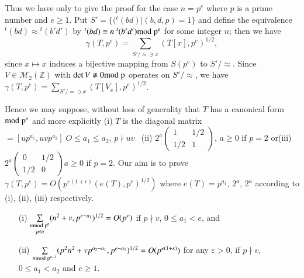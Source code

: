 Thus we have only to give the proof for the case $n=p^{e}$ where $p$
is a prime number and $e\geq 1$. Put $S'=\{({}^{t}(bd)|(b,d,p)=1\}$
and define the equivalence ${}^{t}(bd)\approx {}^{t}(b'd')$ by
${}^{t}(bd)\equiv n \; {}^{t}(b'd')\rm{mod} \; p^{e}$ for some integer $n$; then
we have
$$
\gamma(T,p^{e})=\sum_{S'/\approx \ni x}(T[x],p^{e})^{1/2},
$$
since $x\mapsto x$ induces a bijective mapping from $S(p^{e})$ to
$S'/\approx$. Since $V\in\mathscr{M}_{2}(\mathbb{Z})$ with $\det
V\not\equiv 0\rm{mod} \; p$ operates on $S'/\approx$, we have
$\gamma(T,p^{e})=\sum\limits_{S'/=\ni x}(T[V_{x}],p^{e})^{1/2}$.

Hence we may suppose, without loss of generality that $T$ has a
canonical form $\rm{mod} \; p^{e}$ and more explicitly (i) $T$ is the
diagonal matrix $=[up^{a_{1}},uvp^{a_{2}}] \; O\leq a_{1}\leq a_{2}$,
$p\nmid uv$~ (ii) $2^{a}\left(\begin{smallmatrix} 1 & 1/2\\ 1/2 & 1
\end{smallmatrix}\right)$, $a\geq 0$ if $p=2$ 
or\pageoriginale (iii) $2^{a}\left(\begin{smallmatrix} 0 & 1/2\\ 1/2 & 0
\end{smallmatrix}\right)a\geq 0$ if $p=2$. Our aim is to prove
$\gamma(T,p^{e})=O(p^{e(1+\epsilon)}(e(T),p^{e})^{1/2})$ where
$e(T)=p^{a_{1}}$, $2^{a}$, $2^{a}$ according to (i), (ii), (iii)
respectively. 

\begin{sublemma}\label{c1:lem-1.5.19}
\begin{itemize}
\item[{\rm (i)}] $\sum\limits_{\substack{n\rm{mod} \; p^{e}\\ p\nmid
  n}}(n^{2}+v,p^{e-a_{1}})^{1/2}=O(p^{e})$ if $p\nmid v$, $0\leq
  a_{1}<e$, and

\item[{\rm (ii)}] $\sum\limits_{n\rm{mod} \; p^{e-1}}(p^{2}n^{2}+vp^{a_{2}-a_{1}},
  p^{e-a_{1}})^{1/2}=O(p^{e(1+\varepsilon)})$ for any $\varepsilon>0$, if
  $p\nmid v$, $0\leq a_{1}<a_{2}$ and $e\geq 1$.
\end{itemize}
\end{sublemma}

